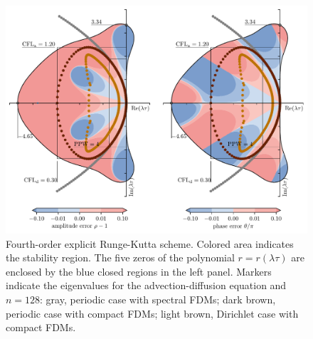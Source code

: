 {\begin{figure}[!ht]
  \centering
  \includegraphics[clip,height=0.7\textwidth]{figs/rkm4}
  \caption{Fourth-order explicit Runge-Kutta scheme. Colored area indicates the stability region. The five zeros of the polynomial $r=r(\lambda\tau)$ are enclosed by the blue closed regions in the left panel. Markers indicate the eigenvalues for the advection-diffusion equation and $n=128$: gray, periodic case with spectral FDMs; dark brown, periodic case with compact FDMs; light brown, Dirichlet case with compact FDMs.}
  \label{fig:rkm}
\end{figure}

}
